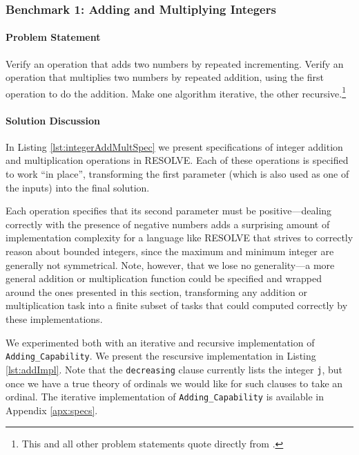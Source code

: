 		\subsubsection{Benchmark 1: Adding and Multiplying Integers}

\paragraph{Problem Statement}Verify an operation that adds two numbers by repeated incrementing. Verify an operation that multiplies two numbers by repeated addition, using the first operation to do the addition. Make one algorithm iterative, the other recursive.\footnote{This and all other problem statements quote directly from \cite{Benchmarks}.}

\paragraph{Solution Discussion}In Listing \ref{lst:integerAddMultSpec} we present specifications of integer addition and multiplication operations in RESOLVE.  Each of these operations is specified to work ``in place'', transforming the first parameter (which is also used as one of the inputs) into the final solution.



Each operation specifies that its second parameter must be positive---dealing correctly with the presence of negative numbers adds a surprising amount of implementation complexity for a language like RESOLVE that strives to correctly reason about bounded integers, since the maximum and minimum integer are generally not symmetrical.  Note, however, that we lose no generality---a more general addition or multiplication function could be specified and wrapped around the ones presented in this section, transforming any addition or multiplication task into a finite subset of tasks that could computed correctly by these implementations.

We experimented both with an iterative and recursive implementation of \texttt{Adding\_Capability}.  We present the rescursive implementation in Listing \ref{lst:addImpl}.  Note that the \texttt{decreasing} clause currently lists the integer \texttt{j}, but once we have a true theory of ordinals we would like for such clauses to take an ordinal.  The iterative implementation of \texttt{Adding\_Capability} is available in Appendix \ref{apx:specs}.

